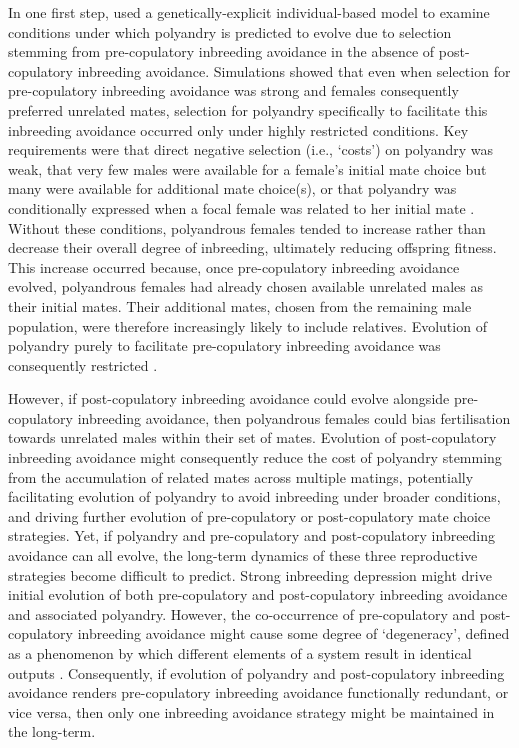 \documentclass[10pt,letterpaper]{article}
\begin{document}
In one first step, \cite{Duthie} used a genetically-explicit individual-based model to examine conditions under which polyandry is predicted to evolve due to selection stemming from pre-copulatory inbreeding avoidance in the absence of post-copulatory inbreeding avoidance. Simulations showed that even when selection for pre-copulatory inbreeding avoidance was strong and females consequently preferred unrelated mates, selection for polyandry specifically to facilitate this inbreeding avoidance occurred only under highly restricted conditions. Key requirements were that direct negative selection (i.e., `costs') on polyandry was weak, that very few males were available for a female's initial mate choice but many were available for additional mate choice(s), or that polyandry was conditionally expressed when a focal female was related to her initial mate \cite[][]{Duthie}. Without these conditions, polyandrous females tended to increase rather than decrease their overall degree of inbreeding, ultimately reducing offspring fitness. This increase occurred because, once pre-copulatory inbreeding avoidance evolved, polyandrous females had already chosen available unrelated males as their initial mates. Their additional mates, chosen from the remaining male population, were therefore increasingly likely to include relatives. Evolution of polyandry purely to facilitate pre-copulatory inbreeding avoidance was consequently restricted \cite[][]{Duthie}. 

However, if post-copulatory inbreeding avoidance could evolve alongside pre-copulatory inbreeding avoidance, then polyandrous females could bias fertilisation towards unrelated males within their set of mates. Evolution of post-copulatory inbreeding avoidance might consequently reduce the cost of polyandry stemming from the accumulation of related mates across multiple matings, potentially facilitating evolution of polyandry to avoid inbreeding under broader conditions, and driving further evolution of pre-copulatory or post-copulatory mate choice strategies. Yet, if polyandry and pre-copulatory and post-copulatory inbreeding avoidance can all evolve, the long-term dynamics of these three reproductive strategies become difficult to predict. Strong inbreeding depression might drive initial evolution of both pre-copulatory and post-copulatory inbreeding avoidance and associated polyandry. However, the co-occurrence of pre-copulatory and post-copulatory inbreeding avoidance might cause some degree of `degeneracy', defined as a phenomenon by which different elements of a system result in identical outputs \cite[][]{Edelman2001}. Consequently, if evolution of polyandry and post-copulatory inbreeding avoidance renders pre-copulatory inbreeding avoidance functionally redundant, or vice versa, then only one inbreeding avoidance strategy might be maintained in the long-term.
\end{document}

